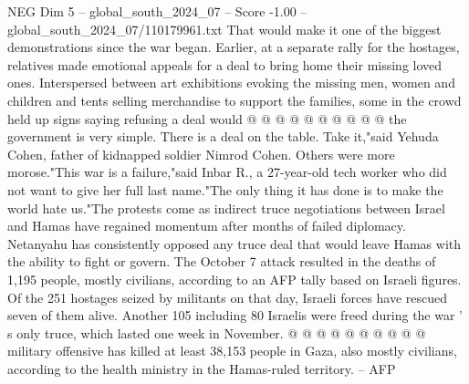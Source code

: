 \begin{textsample}{NEG Dim 5 – global\_south\_2024\_07 – Score -1.00 – global\_south\_2024\_07/110179961.txt}
That would make it one of the biggest demonstrations since the war began.
Earlier, at a separate rally for the hostages, relatives made emotional appeals for a deal to bring home their missing loved ones.
Interspersed between art exhibitions evoking the missing men, women and children and tents selling merchandise to support the families, some in the crowd held up signs saying refusing a deal would @ @ @ @ @ @ @ @ @ @ the government is very simple.
There is a deal on the table.
Take it,"said Yehuda Cohen, father of kidnapped soldier Nimrod Cohen.
Others were more morose."This war is a failure,"said Inbar R., a 27-year-old tech worker who did not want to give her full last name."The only thing it has done is to make the world hate us."The protests come as indirect truce negotiations between Israel and Hamas have regained momentum after months of failed diplomacy.
Netanyahu has consistently opposed any truce deal that would leave Hamas with the ability to fight or govern.
The October 7 attack resulted in the deaths of 1,195 people, mostly civilians, according to an AFP tally based on Israeli figures.
Of the 251 hostages seized by militants on that day, Israeli forces have rescued seven of them alive.
Another 105 including 80 Israelis were freed during the war ' s only truce, which lasted one week in November. @ @ @ @ @ @ @ @ @ @ military offensive has killed at least 38,153 people in Gaza, also mostly civilians, according to the health ministry in the Hamas-ruled territory. -- AFP

\end{textsample}

